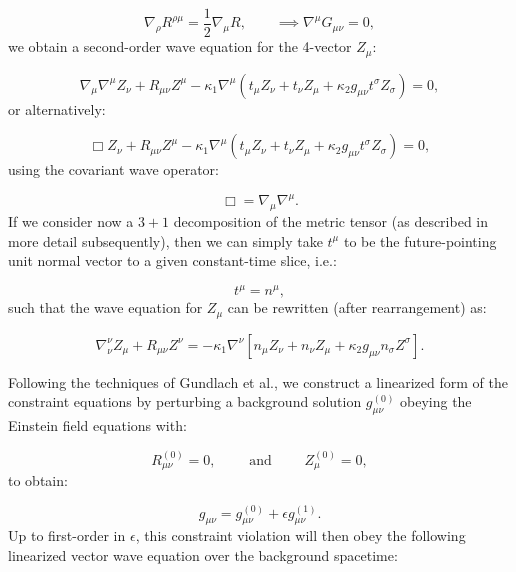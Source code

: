 \documentclass{article}
\begin{document}
\begin{equation}
\nabla_{\rho} R^{\rho \mu} = \frac{1}{2} \nabla_{\mu} R, \qquad \implies \nabla^{\mu} G_{\mu \nu} = 0,
\end{equation}
we obtain a second-order wave equation for the 4-vector ${Z_{\mu}}$:

\begin{equation}
\nabla_{\mu} \nabla^{\mu} Z_{\nu} + R_{\mu \nu} Z^{\mu} - \kappa_1 \nabla^{\mu} \left( t_{\mu} Z_{\nu} + t_{\nu} Z_{\mu} + \kappa_2 g_{\mu \nu} t^{\sigma} Z_{\sigma} \right) = 0,
\end{equation}
or alternatively:

\begin{equation}
\Box Z_{\nu} + R_{\mu \nu} Z^{\mu} - \kappa_1 \nabla^{\mu} \left( t_{\mu} Z_{\nu} + t_{\nu} Z_{\mu} + \kappa_2 g_{\mu \nu} t^{\sigma} Z_{\sigma} \right) = 0,
\end{equation}
using the covariant wave operator:

\begin{equation}
\Box = \nabla_{\mu} \nabla^{\mu}.
\end{equation}
If we consider now a ${3 + 1}$ decomposition of the metric tensor (as described in more detail subsequently), then we can simply take ${t^{\mu}}$ to be the future-pointing unit normal vector to a given constant-time slice, i.e.:

\begin{equation}
t^{\mu} = n^{\mu},
\end{equation}
such that the wave equation for ${Z_{\mu}}$ can be rewritten (after rearrangement) as:

\begin{equation}
\nabla^{\nu}_{\nu} Z_{\mu} + R_{\mu \nu} Z^{\nu} = - \kappa_1 \nabla^{\nu} \left[ n_{\mu} Z_{\nu} + n_{\nu} Z_{\mu} + \kappa_2 g_{\mu \nu} n_{\sigma} Z^{\sigma} \right].
\end{equation}

Following the techniques of Gundlach et al.\cite{gundlach}, we construct a linearized form of the constraint equations by perturbing a background solution ${g_{\mu \nu}^{\left( 0 \right)}}$ obeying the Einstein field equations with:

\begin{equation}
R_{\mu \nu}^{\left( 0 \right)} = 0, \qquad \text{ and } \qquad Z_{\mu}^{\left( 0 \right)} = 0,
\end{equation}
to obtain:

\begin{equation}
g_{\mu \nu} = g_{\mu \nu}^{\left( 0 \right)} + \epsilon g_{\mu \nu}^{\left( 1 \right)}.
\end{equation}
Up to first-order in ${\epsilon}$, this constraint violation will then obey the following linearized vector wave equation over the background spacetime:
\end{document}
